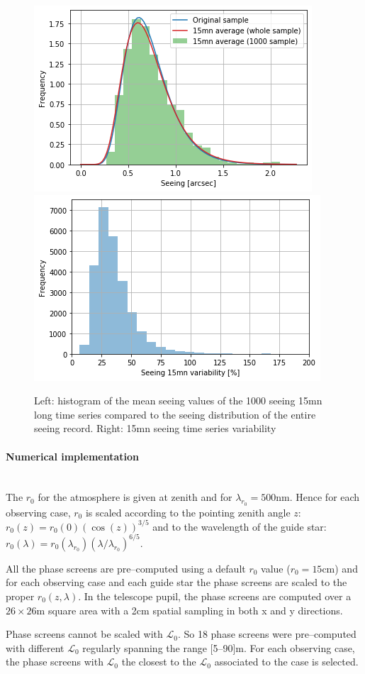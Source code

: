 \documentclass{gmto}
\begin{document}
\begin{figure}
  \centering
  \includegraphics[width=0.495\linewidth]{seeing_15mn_timeseries_stats.png}
  \includegraphics[width=0.495\linewidth]{seeing_variability.png}
  \caption{Left: histogram of the mean seeing values of the 1000 seeing 15mn long time series compared to the seeing distribution of the entire seeing record. Right: 15mn seeing time series variability}
  \label{fig:11}
\end{figure}

\paragraph{Numerical implementation} ~\\
The $r_0$ for the atmosphere is given at zenith and for $\lambda_{r_0}=500$nm.
Hence for each observing case, $r_0$ is scaled according to the pointing zenith
angle $z$: $r_0(z)=r_0(0)(\cos(z))^{3/5}$ and to the wavelength of
the guide star: $r_0(\lambda)=r_0(\lambda_{r_0})(\lambda/\lambda_{r_0})^{6/5}$.

All the phase screens are pre--computed using a default $r_0$ value ($r_0=15$cm)
and for each observing case and each guide star the phase screens are scaled to
the proper $r_0(z,\lambda)$.
In the telescope pupil, the phase screens are computed over a $26\times26$m
square area with a 2cm spatial sampling in both x and y directions.

Phase screens cannot be scaled with $\mathcal L_0$.
So 18 phase screens were pre--computed with different $\mathcal L_0$ regularly
spanning the range [5--90]m.
For each observing case, the phase screens with $\mathcal L_0$ the closest to the
$\mathcal L_0$ associated to the case is selected.
\end{document}
